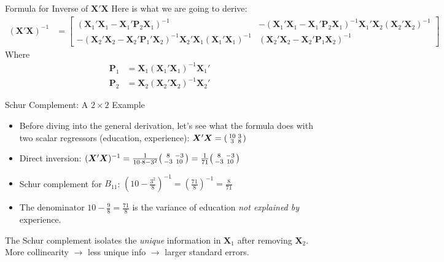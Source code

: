 \documentclass[aspectratio=169, handout, t]{beamer}
\numberwithin{equation}{section}
\begin{document}
\begin{frame}{Formula for Inverse of $\bm{X}'\bm{X}$}
Here is what we are going to derive:
\begin{align*}
(\bm{X}'\bm{X})^{-1}&=\begin{bmatrix} (\bm{X}_1'\bm{X}_1- \bm{X}_1'\bm{P}_2\bm{X}_1)^{-1}&-(\bm{X}_1'\bm{X}_1- \bm{X}_1'\bm{P}_2\bm{X}_1)^{-1}\bm{X}_1'\bm{X}_2 (\bm{X}_2'\bm{X}_2)^{-1} \\
-(\bm{X}_2'\bm{X}_2- \bm{X}_2'\bm{P}_1'\bm{X}_2)^{-1} \bm{X}_2'\bm{X}_1 (\bm{X}_1'\bm{X}_1)^{-1} & (\bm{X}_2'\bm{X}_2- \bm{X}_2'\bm{P}_1\bm{X}_2)^{-1} \end{bmatrix}
\end{align*}
Where
\begin{align*}
\bm{P}_1&=\bm{X}_1(\bm{X}_1'\bm{X}_1)^{-1}\bm{X}_1'\\
\bm{P}_2&=\bm{X}_2(\bm{X}_2'\bm{X}_2)^{-1}\bm{X}_2'
\end{align*}

\end{frame}

\begin{frame}{Schur Complement: A $2\times 2$ Example}
\begin{itemize}\setlength{\itemsep}{2pt}
\item Before diving into the general derivation, let's see what the formula does with two scalar regressors (education, experience):
$\bm{X}'\bm{X}=\begin{psmallmatrix} 10 & 3 \\ 3 & 8 \end{psmallmatrix}$\pause
\item Direct inversion: $(\bm{X}'\bm{X})^{-1}=\frac{1}{10\cdot 8-3^2}\begin{psmallmatrix} 8 & -3 \\ -3 & 10 \end{psmallmatrix}=\frac{1}{71}\begin{psmallmatrix} 8 & -3 \\ -3 & 10 \end{psmallmatrix}$\pause
\item Schur complement for $B_{11}$: $\left(10-\frac{3^2}{8}\right)^{-1}=\left(\frac{71}{8}\right)^{-1}=\frac{8}{71}$ \checkmark\pause
\item The denominator $10-\frac{9}{8}=\frac{71}{8}$ is the variance of education \emph{not explained by} experience.
\end{itemize}
\begin{tcolorbox}[colback=blue!5, colframe=blue!50, boxsep=2pt, top=2pt, bottom=2pt]
The Schur complement isolates the \emph{unique} information in $\bm{X}_1$ after removing $\bm{X}_2$. More collinearity $\to$ less unique info $\to$ larger standard errors.
\end{tcolorbox}
\end{frame}
\end{document}
